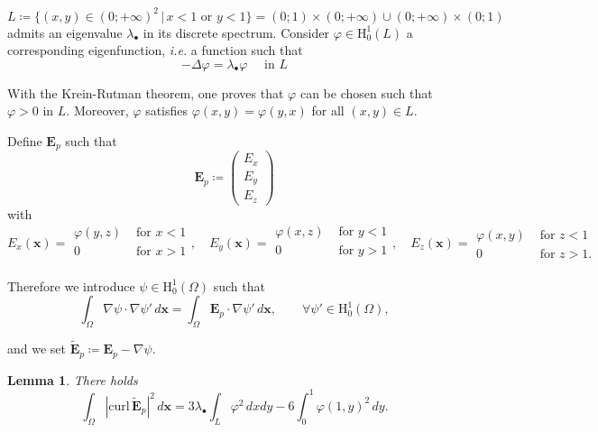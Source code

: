 \documentclass[10pt,a4paper]{amsart}
\newtheorem{lemma}{Lemma}
\def\E{\boldsymbol{E}}
\newcommand{\GL}{L}
\newcommand{\Om}{\Omega}
\newcommand{\bfx}{\boldsymbol{x}}
\newcommand{\curlvec}{\boldsymbol{\mrm{curl}}\,}
\newcommand{\dsp}{\displaystyle}
\newcommand{\mrm}[1]{\mathrm{#1}}
\newcommand{\mH}{\mrm{H}}
\begin{document}
\[
\GL\coloneqq\{(x,y)\in(0;+\infty)^2\,|\,x<1\mbox{ or }y<1\}=(0;1)\times(0;+\infty)\cup(0;+\infty)\times(0;1)
\]
admits an eigenvalue $\lambda_\bullet$ in its discrete spectrum. Consider $\varphi\in\mH^1_0(\GL)$ a corresponding eigenfunction, \textit{i.e.} a function such that 
\begin{equation}\label{Spectral2D}
-\Delta\varphi=\lambda_\bullet\varphi\quad\mbox{ in }\GL
\end{equation}

With the Krein-Rutman theorem, one proves that $\varphi$ can be chosen such that $\varphi>0$ in $\GL$. Moreover, $\varphi$ satisfies $\varphi(x,y)=\varphi(y,x)$ for all $(x,y)\in \GL$.

Define $\E_p$ such that 
\[
\E_p\coloneqq\left(\begin{array}{c}
E_x\\
E_y\\
E_z
\end{array}\right)
\]
with
\[
E_x(\bfx)=\begin{array}{|ll}
\varphi(y,z)& \mbox{ for }x<1\\
0& \mbox{ for }x>1\\
\end{array},\quad E_y(\bfx)=\begin{array}{|ll}
\varphi(x,z)& \mbox{ for }y<1\\
0& \mbox{ for }y>1\\
\end{array},\quad E_z(\bfx)=\begin{array}{|ll}
\varphi(x,y)& \mbox{ for }z<1\\
0& \mbox{ for }z>1.
\end{array}
\]

Therefore we introduce $\psi\in\mH^1_0(\Om)$ such that
\begin{equation}\label{PbDefPsiBis}
\int_\Om\nabla\psi\cdot\nabla\psi'\,d\bfx=\int_\Om\E_{p}\cdot\nabla\psi'\,d\bfx,\qquad \forall\psi'\in\mH^1_0(\Om),
\end{equation}

and we set $\tilde{\E}_{p}\coloneqq\E_{p}-\nabla\psi$.

\begin{lemma}
There holds
\begin{equation}\label{EstimAbove}
\dsp\int_{\Om}|\curlvec \tilde{\E}_p|^2\,d\bfx=3\lambda_\bullet\int_\GL\varphi^2\,dxdy-6\int_0^1\varphi(1,y)^2\,dy.
\end{equation}
\end{lemma}
\end{document}
